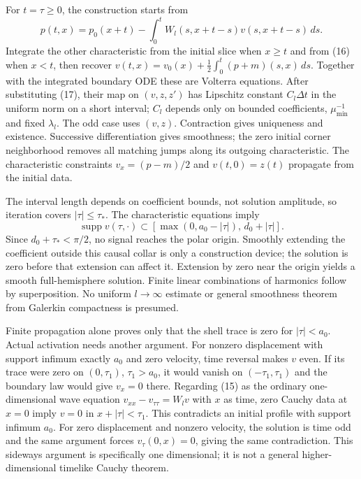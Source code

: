 \documentclass[
  10pt,
]{article}
\begin{document}
For \(t=\tau\ge0\), the construction starts from \[
 p(t,x)=p_0(x+t)-\int_0^tW_l(s,x+t-s)v(s,x+t-s)\,ds.       \tag{17}
\] Integrate the other characteristic from the initial slice when
\(x\ge t\) and from (16) when \(x<t\), then recover
\(v(t,x)=v_0(x)+\frac12\int_0^t(p+m)(s,x)\,ds\). Together with the
integrated boundary ODE these are Volterra equations. After substituting
(17), their map on \((v,z,z')\) has Lipschitz constant \(C_l\Delta t\)
in the uniform norm on a short interval; \(C_l\) depends only on bounded
coefficients, \(\mu_{\min}^{-1}\) and fixed \(\lambda_l\). The odd case
uses \((v,z)\). Contraction gives uniqueness and existence. Successive
differentiation gives smoothness; the zero initial corner neighborhood
removes all matching jumps along its outgoing characteristic. The
characteristic constraints \(v_x=(p-m)/2\) and \(v(t,0)=z(t)\) propagate
from the initial data.

The interval length depends on coefficient bounds, not solution
amplitude, so iteration covers \(|\tau|\le\tau_*\). The characteristic
equations imply \[
 \operatorname{supp}v(\tau,\cdot)
 \subset[\max(0,a_0-|\tau|),\,d_0+|\tau|].                \tag{18}
\] Since \(d_0+\tau_*<\pi/2\), no signal reaches the polar origin.
Smoothly extending the coefficient outside this causal collar is only a
construction device; the solution is zero before that extension can
affect it. Extension by zero near the origin yields a smooth
full-hemisphere solution. Finite linear combinations of harmonics follow
by superposition. No uniform \(l\to\infty\) estimate or general
smoothness theorem from Galerkin compactness is presumed.

Finite propagation alone proves only that the shell trace is zero for
\(|\tau|<a_0\). Actual activation needs another argument. For nonzero
displacement with support infimum exactly \(a_0\) and zero velocity,
time reversal makes \(v\) even. If its trace were zero on
\((0,\tau_1)\), \(\tau_1>a_0\), it would vanish on \((-\tau_1,\tau_1)\)
and the boundary law would give \(v_x=0\) there. Regarding (15) as the
ordinary one-dimensional wave equation \(v_{xx}-v_{\tau\tau}=W_lv\) with
\(x\) as time, zero Cauchy data at \(x=0\) imply \(v=0\) in
\(x+|\tau|<\tau_1\). This contradicts an initial profile with support
infimum \(a_0\). For zero displacement and nonzero velocity, the
solution is time odd and the same argument forces \(v_\tau(0,x)=0\),
giving the same contradiction. This sideways argument is specifically
one dimensional; it is not a general higher-dimensional timelike Cauchy
theorem.
\end{document}
